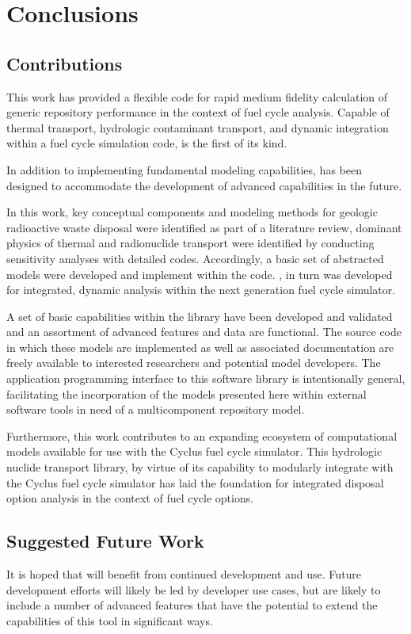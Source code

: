 \chapter{Conclusions}\label{ch:conclusion}
\section{Contributions}

This work has provided a flexible code for rapid medium fidelity calculation of 
generic repository performance in the context of fuel cycle analysis.  Capable 
of thermal transport, hydrologic contaminant transport, and dynamic integration 
within a fuel cycle simulation code, \Cyder is the first of its kind.  

In addition to implementing fundamental modeling capabilities, \Cyder has been 
designed to accommodate the development of advanced capabilities in the future.

In this work, key conceptual components and modeling methods for geologic 
radioactive waste disposal were identified as part of a literature review, 
dominant physics of thermal and radionuclide transport were identified by 
conducting sensitivity analyses with detailed codes. Accordingly, a basic set 
of abstracted models were developed and implement within the \Cyder code. 
\Cyder, in turn was developed for integrated, dynamic analysis within the 
\Cyclus next generation fuel cycle simulator. 

A set of basic capabilities within the \Cyder library have been developed and
validated and an assortment of advanced features and data are functional.
The \Cyder source code in which these models are implemented as well as 
associated documentation are freely available to interested researchers and 
potential model developers. The application programming interface to this 
software library is intentionally general, facilitating the incorporation of 
the models presented here within external software tools in need of a 
multicomponent repository model.

Furthermore, this work contributes to an expanding ecosystem of computational 
models available for use with the Cyclus fuel cycle simulator. This hydrologic 
nuclide transport library, by virtue of its capability to modularly integrate 
with the Cyclus fuel cycle simulator has laid the foundation for integrated 
disposal option analysis in the context of fuel cycle options. 

\section{Suggested Future Work}
It is hoped that \Cyder will benefit from continued development and use. Future 
development efforts will likely be led by developer use cases, but are likely 
to include a number of advanced features that have the potential to extend the 
capabilities of this tool in significant ways. 

